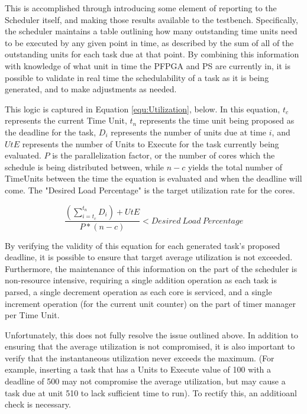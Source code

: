 This is accomplished through introducing some element of reporting to the Scheduler itself, and making those results available to the testbench. Specifically, the scheduler maintains a table outlining how many outstanding time units need to be executed by any given point in time, as described by the sum of all of the outstanding units for each task due at that point. By combining this information with knowledge of what unit in time the PFPGA and PS are currently in, it is possible to validate in real time the schedulability of a task as it is being generated, and to make adjustments as needed. 

This logic is captured in Equation \ref{equ:Utilization}, below. In this equation, $t_c$ represents the current Time Unit, $t_n$ represents the time unit being proposed as the deadline for the task, $D_i$ represents the number of units due at time $i$, and $UtE$ represents the number of Units to Execute for the task currently being evaluated. $P$ is the parallelization factor, or the number of cores which the schedule is being distributed between, while $n-c$ yields the total number of TimeUnits between the time the equation is evaluated and when the deadline will come. The "Desired Load Percentage" is the target utilization rate for the cores.

\begin{equation}\label{equ:Utilization}
    \frac{(\sum_{i=t_c}^{t_n}D_i)+UtE}{P*(n-c)} < Desired\:Load\:Percentage
\end{equation}

By verifying the validity of this equation for each generated task's proposed deadline, it is possible to ensure that target average utilization is not exceeded. Furthermore, the maintenance of this information on the part of the scheduler is non-resource intensive, requiring a single addition operation as each task is parsed, a single decrement operation as each core is serviced, and a single increment operation (for the current unit counter) on the part of timer manager per Time Unit.

Unfortunately, this does not fully resolve the issue outlined above. In addition to ensuring that the average utilization is not compromised, it is also important to verify that the instantaneous utilization never exceeds the maximum. (For example, inserting a task that has a Units to Execute value of 100 with a deadline of 500 may not compromise the average utilization, but may cause a task due at unit 510 to lack sufficient time to run). To rectify this, an additioanl check is necessary. 

